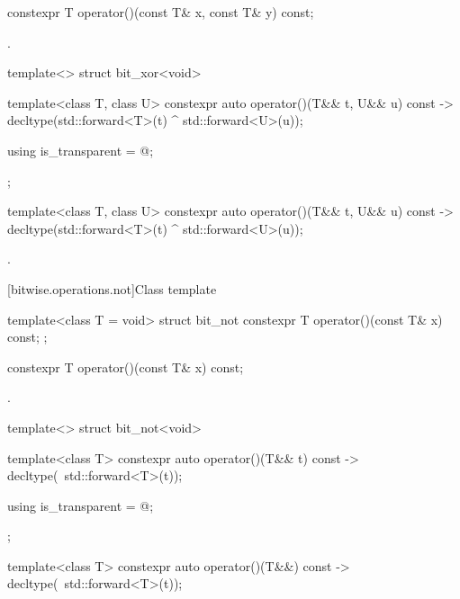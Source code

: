 %
\begin{itemdecl}
constexpr T operator()(const T& x, const T& y) const;
\end{itemdecl}

\begin{itemdescr}
\pnum\returns {}.
\end{itemdescr}

%
\begin{itemdecl}
template<> struct bit_xor<void> {
  template<class T, class U> constexpr auto operator()(T&& t, U&& u) const
    -> decltype(std::forward<T>(t) ^ std::forward<U>(u));

  using is_transparent = @\unspec@;
};
\end{itemdecl}

%
\begin{itemdecl}
template<class T, class U> constexpr auto operator()(T&& t, U&& u) const
    -> decltype(std::forward<T>(t) ^ std::forward<U>(u));
\end{itemdecl}

\begin{itemdescr}
\pnum\returns {}.
\end{itemdescr}

[bitwise.operations.not]{Class template }

\begin{itemdecl}
template<class T = void> struct bit_not {
  constexpr T operator()(const T& x) const;
};
\end{itemdecl}

%
\begin{itemdecl}
constexpr T operator()(const T& x) const;
\end{itemdecl}

\begin{itemdescr}
\pnum\returns {}.
\end{itemdescr}

%
\begin{itemdecl}
template<> struct bit_not<void> {
  template<class T> constexpr auto operator()(T&& t) const
    -> decltype(~std::forward<T>(t));

  using is_transparent = @\unspec@;
};
\end{itemdecl}

%
\begin{itemdecl}
template<class T> constexpr auto operator()(T&&) const
    -> decltype(~std::forward<T>(t));
\end{itemdecl}

